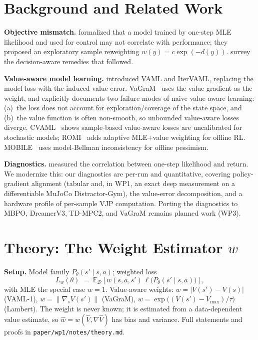 \documentclass{article}
\theoremstyle{plain}
\begin{document}
\section{Background and Related Work}

\textbf{Objective mismatch.} \citet{lambert2020objective} formalized that a
model trained by one-step MLE likelihood and used for control may not correlate with
performance; they proposed an exploratory sample reweighting $w(y) = c \exp(-d(y))$.
\citet{wei2024unified} survey the decision-aware remedies that followed.

\textbf{Value-aware model learning.} \citet{farahmand2017vaml,farahmand2018itervaml}
introduced VAML and IterVAML, replacing the model loss with the induced value error.
VaGraM~\citep{voelcker2022vagram} uses the value gradient as the weight, and explicitly
documents two failure modes of naive value-aware learning: (a)~the loss does not account
for exploration/coverage of the state space, and (b)~the value function is often
non-smooth, so unbounded value-aware losses diverge. CVAML~\citep{cvaml2025} shows
sample-based value-aware losses are uncalibrated for stochastic models; ROMI~\citep{romi2026}
adds adaptive MLE+value weighting for offline RL. MOBILE~\citep{sun2023mobile} uses
model-Bellman inconsistency for offline pessimism.

\textbf{Diagnostics.} \citet{lambert2020objective} measured the correlation
between one-step likelihood and return. We modernize this: our diagnostics are per-run
and quantitative, covering policy-gradient alignment (tabular and, in WP1, an exact
deep measurement on a differentiable MuJoCo Distractor-Gym), the value-error
decomposition, and a hardware profile of per-sample VJP computation. Porting the
diagnostics to MBPO, DreamerV3, TD-MPC2, and VaGraM remains planned work (WP3).

\section{Theory: The Weight Estimator \texorpdfstring{$w$}{w}}
\label{sec:theory}

\textbf{Setup.} Model family $P_\theta(s' \mid s, a)$; weighted loss
\begin{equation}
  L_w(\theta) \;=\; \mathbb{E}_{\mathcal{D}}\!\left[
    w(s, a, s')\, \ell\bigl(P_\theta(s' \mid s, a)\bigr)
  \right],
  \label{eq:weighted-loss}
\end{equation}
with MLE the special case $w = 1$. Value-aware weights: $w = \lvert V(s') - V(s)\rvert$
(VAML-1), $w = \lVert \nabla_s V(s')\rVert$ (VaGraM),
$w = \exp\bigl((V(s') - V_{\max})/\tau\bigr)$ (Lambert). The weight is never known; it
is estimated from a data-dependent value estimate, so
$\hat{w} = w(\hat{V}, \nabla \hat{V})$ has bias and variance. Full statements and proofs
in \texttt{paper/wp1/notes/theory.md}.
\end{document}
